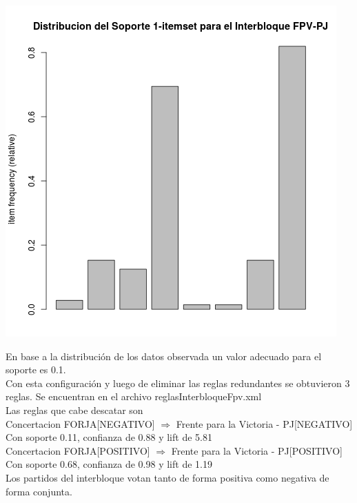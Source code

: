 \documentclass{endm}
\begin{document}
\begin{center}
\includegraphics[scale=0.4]{graficos/soportesInterbloquesFpv.png}
\end{center}

En base a la distribución de los datos observada un valor adecuado para el soporte es 0.1.\\

Con esta configuración y luego de eliminar las reglas redundantes se obtuvieron 3 reglas. Se encuentran en el archivo reglasInterbloqueFpv.xml  \\

Las reglas que cabe descatar son \\

{Concertacion FORJA[NEGATIVO]} $\Longrightarrow$ {Frente para la Victoria - PJ[NEGATIVO]} \\

Con soporte 0.11, confianza de 0.88 y lift de 5.81 \\

{Concertacion FORJA[POSITIVO]} $\Longrightarrow$ {Frente para la Victoria - PJ[POSITIVO]} \\

Con soporte 0.68, confianza de 0.98 y lift de 1.19 \\

Los partidos del interbloque votan tanto de forma positiva como negativa de forma conjunta. \\
\end{document}
